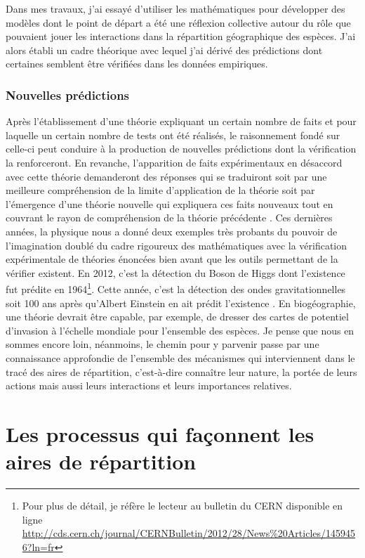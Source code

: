Dans mes travaux, j'ai essayé d'utiliser les mathématiques pour
développer des modèles dont le point de départ a été une réflexion
collective autour du rôle que pouvaient jouer les interactions dans la
répartition géographique des espèces. J'ai alors établi un cadre
théorique avec lequel j'ai dérivé des prédictions dont certaines
semblent être vérifiées dans les données empiriques.

\subsubsection*{Nouvelles prédictions}\label{nouvelles-pruxe9dictions}

Après l'établissement d'une théorie expliquant un certain nombre de
faits et pour laquelle un certain nombre de tests ont été réalisés, le
raisonnement fondé sur celle-ci peut conduire à la production de
nouvelles prédictions dont la vérification la renforceront. En revanche,
l'apparition de faits expérimentaux en désaccord avec cette théorie
demanderont des réponses qui se traduiront soit par une meilleure
compréhension de la limite d'application de la théorie soit par
l'émergence d'une théorie nouvelle qui expliquera ces faits nouveaux
tout en couvrant le rayon de compréhension de la théorie précédente
\citep{Popper1959}. Ces dernières années, la physique nous a donné deux
exemples très probants du pouvoir de l'imagination doublé du cadre
rigoureux des mathématiques avec la vérification expérimentale de
théories énoncées bien avant que les outils permettant de la vérifier
existent. En 2012, c'est la détection du Boson de Higgs dont l'existence
fut prédite en 1964\footnote{Pour plus de détail, je réfère le lecteur
  au bulletin du CERN disponible en ligne
  \url{http://cds.cern.ch/journal/CERNBulletin/2012/28/News\%20Articles/1459456?ln=fr}}.
Cette année, c'est la détection des ondes gravitationnelles soit 100 ans
après qu'Albert Einstein en ait prédit l'existence \citep{Waldrop2016}.
En biogéographie, une théorie devrait être capable, par exemple, de
dresser des cartes de potentiel d'invasion à l'échelle mondiale pour
l'ensemble des espèces. Je pense que nous en sommes encore loin,
néanmoins, le chemin pour y parvenir passe par une connaissance
approfondie de l'ensemble des mécanismes qui interviennent dans le tracé
des aires de répartition, c'est-à-dire connaître leur nature, la portée
de leurs actions mais aussi leurs interactions et leurs importances
relatives.

\section*{Les processus qui façonnent les aires de
répartition}\label{les-processus-qui-fauxe7onnent-les-aires-de-ruxe9partition}

